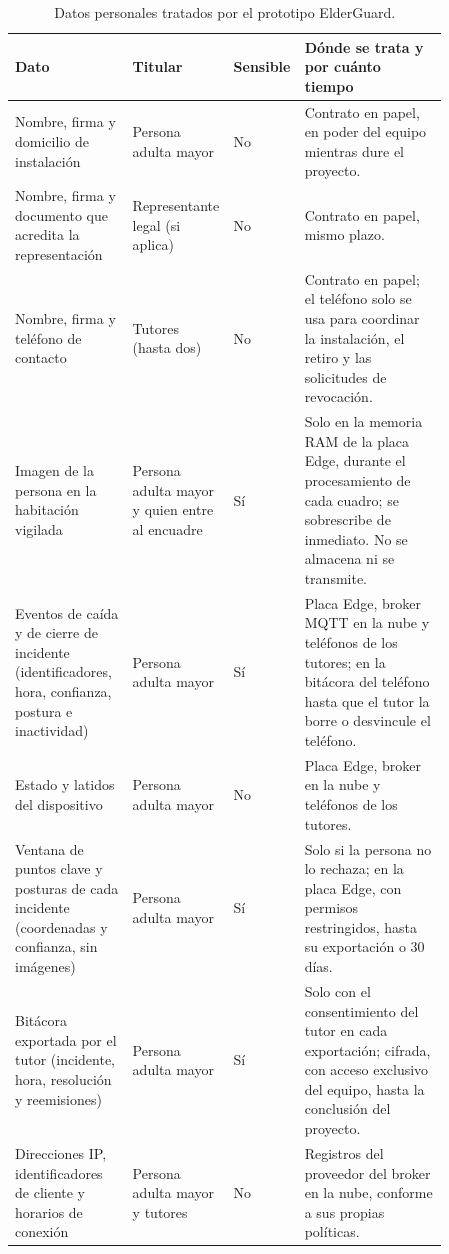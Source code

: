 \documentclass[12pt,a4paper,oneside]{book}
\theoremstyle{plain}
\theoremstyle{definition}
\theoremstyle{remark}
\begin{document}
\begin{table}[htbp]
\centering
\caption{Datos personales tratados por el prototipo ElderGuard.}
\label{tab:anx-datos}
\small
\begin{tabular}{|p{0.27\linewidth}|p{0.16\linewidth}|p{0.10\linewidth}|p{0.33\linewidth}|}
\hline
\textbf{Dato} & \textbf{Titular} & \textbf{Sensible} & \textbf{Dónde se trata y por cuánto tiempo} \\ \hline
Nombre, firma y domicilio de instalación & Persona adulta mayor & No & Contrato en papel, en poder del equipo mientras dure el proyecto. \\ \hline
Nombre, firma y documento que acredita la representación & Representante legal (si aplica) & No & Contrato en papel, mismo plazo. \\ \hline
Nombre, firma y teléfono de contacto & Tutores (hasta dos) & No & Contrato en papel; el teléfono solo se usa para coordinar la instalación, el retiro y las solicitudes de revocación. \\ \hline
Imagen de la persona en la habitación vigilada & Persona adulta mayor y quien entre al encuadre & Sí & Solo en la memoria RAM de la placa Edge, durante el procesamiento de cada cuadro; se sobrescribe de inmediato. No se almacena ni se transmite. \\ \hline
Eventos de caída y de cierre de incidente (identificadores, hora, confianza, postura e inactividad) & Persona adulta mayor & Sí & Placa Edge, broker MQTT en la nube y teléfonos de los tutores; en la bitácora del teléfono hasta que el tutor la borre o desvincule el teléfono. \\ \hline
Estado y latidos del dispositivo & Persona adulta mayor & No & Placa Edge, broker en la nube y teléfonos de los tutores. \\ \hline
Ventana de puntos clave y posturas de cada incidente (coordenadas y confianza, sin imágenes) & Persona adulta mayor & Sí & Solo si la persona no lo rechaza; en la placa Edge, con permisos restringidos, hasta su exportación o 30 días. \\ \hline
Bitácora exportada por el tutor (incidente, hora, resolución y reemisiones) & Persona adulta mayor & Sí & Solo con el consentimiento del tutor en cada exportación; cifrada, con acceso exclusivo del equipo, hasta la conclusión del proyecto. \\ \hline
Direcciones IP, identificadores de cliente y horarios de conexión & Persona adulta mayor y tutores & No & Registros del proveedor del broker en la nube, conforme a sus propias políticas. \\ \hline
\end{tabular}
\end{table}
\end{document}
